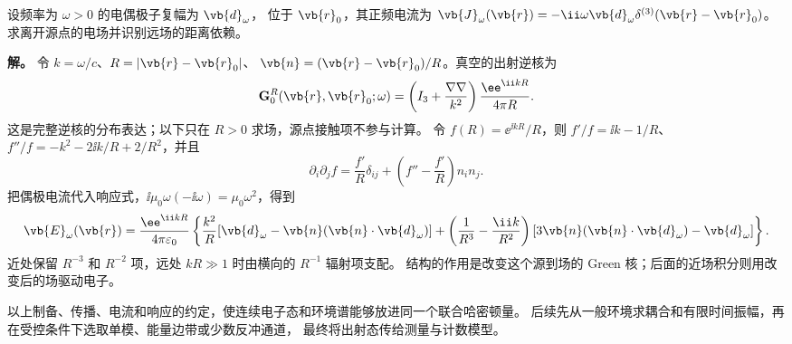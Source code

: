 \begin{example}[真空中谐振电偶极子的场]
设频率为 $\omega>0$ 的电偶极子复幅为 $\vb{d}_\omega$，
位于 $\vb{r}_0$，其正频电流为
$\vb{J}_\omega(\vb{r})=-\ii\omega\vb{d}_\omega\delta^{(3)}(\vb{r}-\vb{r}_0)$。
求离开源点的电场并识别远场的距离依赖。

\textbf{解。} 令 $k=\omega/c$、$R=|\vb{r}-\vb{r}_0|$、
$\vb{n}=(\vb{r}-\vb{r}_0)/R$。真空的出射逆核为
\[
\mathbf G_0^R(\vb{r},\vb{r}_0;\omega)
=\left(I_3+\frac{\nabla\nabla}{k^2}\right)\frac{\ee^{\ii kR}}{4\pi R}.
\]
这是完整逆核的分布表达；以下只在 $R>0$ 求场，源点接触项不参与计算。
令 $f(R)=\ee^{\ii kR}/R$，则
$f'/f=\ii k-1/R$、$f''/f=-k^2-2\ii k/R+2/R^2$，并且
\[
\partial_i\partial_jf
=\frac{f'}R\delta_{ij}
+\left(f''-\frac{f'}R\right)n_in_j.
\]
把偶极电流代入响应式，$\ii\mu_0\omega(-\ii\omega)=\mu_0\omega^2$，得到
\[
\vb{E}_\omega(\vb{r})=\frac{\ee^{\ii kR}}{4\pi\varepsilon_0}
\left\{\frac{k^2}{R}[\vb{d}_\omega-\vb{n}(\vb{n}\cdot\vb{d}_\omega)]
+\left(\frac1{R^3}-\frac{\ii k}{R^2}\right)
[3\vb{n}(\vb{n}\cdot\vb{d}_\omega)-\vb{d}_\omega]\right\}.
\]
近处保留 $R^{-3}$ 和 $R^{-2}$ 项，远处 $kR\gg1$ 时由横向的 $R^{-1}$ 辐射项支配。
结构的作用是改变这个源到场的 Green 核；后面的近场积分则用改变后的场驱动电子。
\end{example}

以上制备、传播、电流和响应的约定，使连续电子态和环境谱能够放进同一个联合哈密顿量。
后续先从一般环境求耦合和有限时间振幅，再在受控条件下选取单模、能量边带或少数反冲通道，
最终将出射态传给测量与计数模型。
